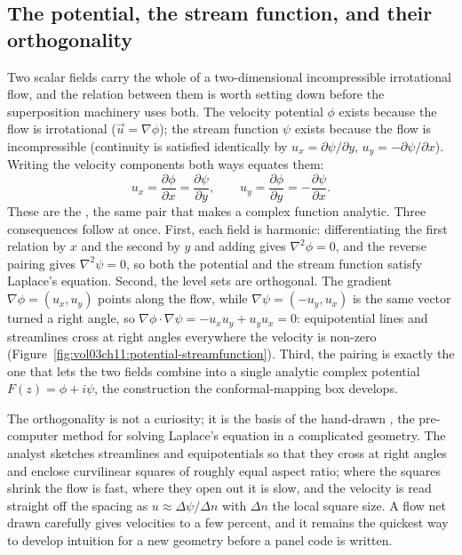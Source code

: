 \subsection{The potential, the stream function, and their orthogonality}

Two scalar fields carry the whole of a two-dimensional incompressible
irrotational flow, and the relation between them is worth setting down
before the superposition machinery uses both. The velocity potential
$\phi$ exists because the flow is irrotational ($\vec u = \nabla\phi$);
the stream function $\psi$ exists because the flow is incompressible
(continuity is satisfied identically by $u_x = \partial\psi/\partial y$,
$u_y = -\partial\psi/\partial x$). Writing the velocity components both
ways equates them:
\[
u_x = \frac{\partial\phi}{\partial x} = \frac{\partial\psi}{\partial y},
\qquad
u_y = \frac{\partial\phi}{\partial y} = -\frac{\partial\psi}{\partial x}.
\]
These are the , the same pair that
makes a complex function analytic. Three consequences follow at once.
First, each field is harmonic: differentiating the first relation by
$x$ and the second by $y$ and adding gives $\nabla^2\phi = 0$, and the
reverse pairing gives $\nabla^2\psi = 0$, so both the potential and the
stream function satisfy Laplace's equation. Second, the level sets are
orthogonal. The gradient $\nabla\phi = (u_x, u_y)$ points along the
flow, while $\nabla\psi = (-u_y, u_x)$ is the same vector turned a
right angle, so $\nabla\phi\cdot\nabla\psi = -u_x u_y + u_y u_x = 0$:
equipotential lines and streamlines cross at right angles everywhere
the velocity is non-zero (Figure~\ref{fig:vol03ch11:potential-streamfunction}).
Third, the pairing is exactly the one that lets the two fields combine
into a single analytic complex potential $F(z) = \phi + i\psi$, the
construction the conformal-mapping box develops.



The orthogonality is not a curiosity; it is the basis of the
hand-drawn , the pre-computer method for solving
Laplace's equation in a complicated geometry. The analyst sketches
streamlines and equipotentials so that they cross at right angles and
enclose curvilinear squares of roughly equal aspect ratio; where the
squares shrink the flow is fast, where they open out it is slow, and
the velocity is read straight off the spacing as $u \approx
\Delta\psi/\Delta n$ with $\Delta n$ the local square size. A flow net
drawn carefully gives velocities to a few percent, and it remains the
quickest way to develop intuition for a new geometry before a panel
code is written.

